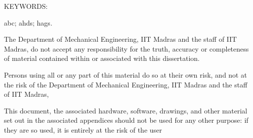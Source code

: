 \documentclass[BTech]{iitmdiss}
\begin{document}


\acknowledgements

\lipsum[1]



\abstract

\noindent KEYWORDS: \hspace*{0.5em} \parbox[t]{4.4in}{abc; ahds; hags.}

\vspace*{24pt}
\noindent
\lipsum[2]


\pagebreak

\disclaimer
The Department of Mechanical Engineering, IIT Madras and the staff of IIT Madras, do not accept any responsibility for the truth, accuracy or completeness of material contained within or associated with this dissertation.

Persons using all or any part of this material do so at their own risk, and not at the risk of the Department of Mechanical Engineering, IIT Madras and the staff of IIT Madras,

This document, the associated hardware, software, drawings, and other material set out in the associated appendices should not be used for any other purpose: if they are so used, it is entirely at the risk of the user

\pagebreak



\begin{singlespace}
\tableofcontents
\thispagestyle{empty}

\listoftables
{}
\listoffigures
{}
\end{singlespace}


\newpage
\begin{tabbing}

\end{tabbing}
\abbreviations
\end{document}
